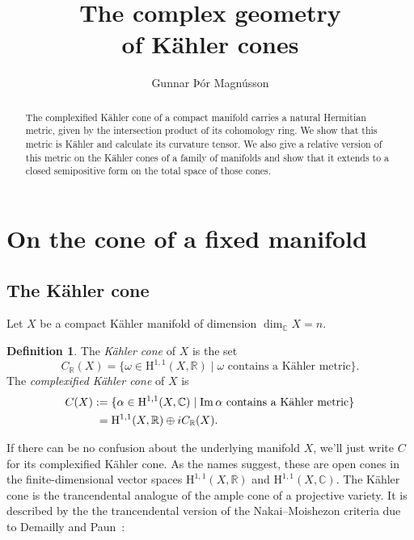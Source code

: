 \documentclass[11pt,a4paper]{amsart}
\title[The complex geometry of K\"{a}hler cones]
{The complex geometry\\of K\"{a}hler cones}
\author{Gunnar Þór Magnússon}
\theoremstyle{definition}
\newtheorem*{defi}{Definition}
\theoremstyle{remark}
\newcommand{\RR}{\mathbb{R}}
\newcommand{\CC}{\mathbb{C}}
\def\Im{\mathop{\rm Im}}
\def\coho#1{\mathrm{H}^{#1}}
\def\kf{\omega}
\def\ckf{\alpha}
\def\KC{C}
\begin{document}
\begin{abstract}
The complexified K\"{a}hler cone of a compact manifold carries a natural
Hermitian metric, given by the intersection product of its cohomology
ring. We show that this metric is K\"{a}hler and calculate its curvature
tensor. We also give a relative version of this metric on the K\"{a}hler
cones of a family of manifolds and show that it extends to a closed
semipositive form on the total space of those cones.
\end{abstract}

\maketitle



\section{On the cone of a fixed manifold}

\subsection{The K\"{a}hler cone}
Let $X$ be a compact K\"{a}hler manifold of dimension $\dim_{\CC} X = n$.

\begin{defi}
The \emph{K\"{a}hler cone} of $X$ is the set
\begin{equation*}
C_{\RR}(X) = \{ \kf \in \coho{1,1}(X,\RR) 
\mid
\text{$\kf$ contains a K\"{a}hler metric}
\}.
\end{equation*}
The \emph{complexified K\"{a}hler cone} of $X$ is
\begin{align*}
\KC(X) 
&:=
\{ \ckf \in \coho{1,1}(X,\CC) 
\mid
\text{$\Im\ckf$ contains a K\"{a}hler metric}
\}
\\
&\phantom{:}= \coho{1,1}(X,\RR) \oplus i C_{\RR}(X).
\end{align*}
\end{defi}

If there can be no confusion about the underlying manifold $X$, we'll
just write $C$ for its complexified K\"{a}hler cone.
As the names suggest, these are open cones in the finite-dimensional
vector spaces $\coho{1,1}(X,\RR)$ and $\coho{1,1}(X,\CC)$. The K\"{a}hler
cone is the trancendental analogue of the ample cone of a projective
variety. It is described by the the trancendental version of the 
Nakai--Moishezon criteria due to Demailly and Paun~\cite{DemaillyPaun}:
\end{document}
